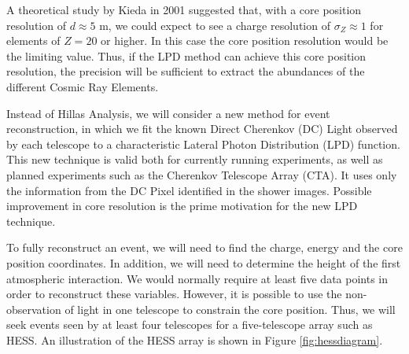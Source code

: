 \documentclass[11pt]{article}
\begin{document}
A theoretical study by Kieda in 2001 \cite{kieda01} suggested that, with a core position resolution of $d \approx 5 $ m, we could expect to see a charge resolution of $ \sigma_{Z} \approx 1 $ for elements of $Z = 20$ or higher. In this case the core position resolution would be the limiting value. Thus, if the LPD method can achieve this core position resolution, the precision will be sufficient to extract the abundances of the different Cosmic Ray Elements. 

Instead of Hillas Analysis, we will consider a new method for event reconstruction, in which we fit the known Direct Cherenkov (DC) Light observed by each telescope to a characteristic Lateral Photon Distribution (LPD) function. This new technique is valid both for currently running experiments, as well as planned experiments such as the Cherenkov Telescope Array (CTA). It uses only the information from the DC Pixel identified in the shower images. Possible improvement in core resolution is the prime motivation for the new LPD technique.

To fully reconstruct an event, we will need to find the charge, energy and the core position coordinates. In addition, we will need to determine the height of the first atmospheric interaction. We would normally require at least five data points in order to reconstruct these variables. However, it is possible to use the non-observation of light in one telescope to constrain the core position. Thus, we will seek events seen by at least four telescopes for a five-telescope array such as HESS. An illustration of the HESS array is shown in Figure \ref{fig:hessdiagram}.
\end{document}
